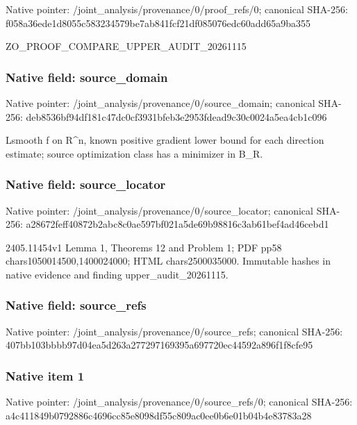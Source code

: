\documentclass[10pt,a4paper]{article}
\begin{document}
Native pointer: /joint\_analysis/provenan\allowbreak{}ce/0/proof\_refs/0; canonical SHA-256: f058a36ede1d8055c5832345\allowbreak{}79be7ab841fcf21df085076e\allowbreak{}dc60add65a9ba355


ZO\_PROOF\_COMPARE\_UPPER\_AUDIT\_20261115


\subsubsection{Native field: source\_domain}


Native pointer: /joint\_analysis/provenan\allowbreak{}ce/0/source\_domain; canonical SHA-256: deb8536bf94df181c47dc0cf\allowbreak{}3931bfeb3e2953fdead9c30c\allowbreak{}0024a5ea4cb1c096


Lsmooth f on R\textasciicircum{}n, known positive gradient lower bound for each direction estimate; source optimization class has a minimizer in B\_R.


\subsubsection{Native field: source\_locator}


Native pointer: /joint\_analysis/provenan\allowbreak{}ce/0/source\_locator; canonical SHA-256: a28672feff40872b2abc8c0a\allowbreak{}e597bf021a5de69b98816c3a\allowbreak{}b61bef4ad46cebd1


2405.11454v1 Lemma 1, Theorems 12 and Problem 1; PDF pp58 chars1050014500,1400024000; HTML chars2500035000. Immutable hashes in native evidence and finding upper\_audit\_20261115.


\subsubsection{Native field: source\_refs}


Native pointer: /joint\_analysis/provenan\allowbreak{}ce/0/source\_refs; canonical SHA-256: 407bb103bbbb97d04ea5d263\allowbreak{}a277297169395a697720ec44\allowbreak{}592a896f1f8cfe95



\subsubsection{Native item 1}


Native pointer: /joint\_analysis/provenan\allowbreak{}ce/0/source\_refs/0; canonical SHA-256: a4c411849b0792886c4696cc\allowbreak{}85e8098df55c809ac0ee0b6e\allowbreak{}01b04b4e83783a28
\end{document}
